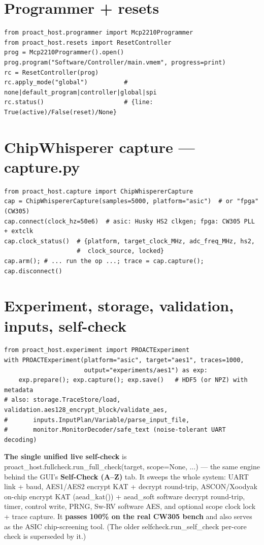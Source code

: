 \documentclass[11pt,a4paper]{report}
\newcommand{\code}[1]{{\ttfamily\small #1}}
\begin{document}
\section{Programmer + resets}
\begin{lstlisting}[style=py]
from proact_host.programmer import Mcp2210Programmer
from proact_host.resets import ResetController
prog = Mcp2210Programmer().open()
prog.program("Software/Controller/main.vmem", progress=print)
rc = ResetController(prog)
rc.apply_mode("global")          # none|default_program|controller|global|spi
rc.status()                      # {line: True(active)/False(reset)/None}
\end{lstlisting}

\section{ChipWhisperer capture --- \code{capture.py}}
\begin{lstlisting}[style=py]
from proact_host.capture import ChipWhispererCapture
cap = ChipWhispererCapture(samples=5000, platform="asic")  # or "fpga" (CW305)
cap.connect(clock_hz=50e6)  # asic: Husky HS2 clkgen; fpga: CW305 PLL + extclk
cap.clock_status()  # {platform, target_clock_MHz, adc_freq_MHz, hs2,
                    #  clock_source, locked}
cap.arm(); # ... run the op ...; trace = cap.capture(); cap.disconnect()
\end{lstlisting}

\section{Experiment, storage, validation, inputs, self-check}
\begin{lstlisting}[style=py]
from proact_host.experiment import PROACTExperiment
with PROACTExperiment(platform="asic", target="aes1", traces=1000,
                      output="experiments/aes1") as exp:
    exp.prepare(); exp.capture(); exp.save()   # HDF5 (or NPZ) with metadata
# also: storage.TraceStore/load, validation.aes128_encrypt_block/validate_aes,
#       inputs.InputPlan/Variable/parse_input_file,
#       monitor.MonitorDecoder/safe_text (noise-tolerant UART decoding)
\end{lstlisting}
\textbf{The single unified live self-check} is
\code{proact\_host.fullcheck.run\_full\_check(target, scope=None, ...)} --- the
same engine behind the GUI's \textbf{Self-Check (A--Z)} tab. It sweeps the whole
system: UART link + baud, AES1/AES2 encrypt KAT + decrypt round-trip,
ASCON/Xoodyak on-chip encrypt KAT (\code{aead\_kat()}) + \code{aead\_soft}
software decrypt round-trip, timer, control write, PRNG, Sw-RV software AES, and
optional scope clock lock + trace capture. It \textbf{passes 100\% on the real
CW305 bench} and also serves as the ASIC chip-screening tool. (The older
\code{selfcheck.run\_self\_check} per-core check is superseded by it.)
\end{document}
